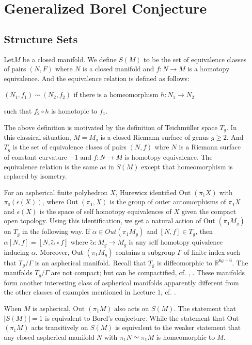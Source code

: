 \chapter{Generalized Borel Conjecture}\label{c2}

\section{Structure Sets}\label{c2:sec2.1}

Let\pageoriginale $M$ be a closed manifold. We define $S(M)$ to be the set of
equivalence classes of pairs $(N, F)$ where $N$ is a closed manifold
and $f:N \to M$ is a homotopy equivalence. And the equivalence
relation is defined as follows:
\begin{center}
  $(N_1 , f_1) \sim (N_2, f_2)$ if there is a homeomorphism $h: N_1
  \to N_2$
\end{center}
such that $f_2 \circ h$ is homotopic to $f_1$.

The above definition is motivated by the definition of Teichm\"uller
space $T_g$. In this classical situation, $M = M_g$ is a closed
Riemann surface of genus $g \geq 2$. And $T_g$ is the set of
equivalence clases of pairs $(N, f)$ whre $N$ is a Riemann surface of
constant curvature $-1$ and $f:N \to M$ is homotopy equivalence. The
equivalence relation is the same as in $S(M)$ except that
homeomorphism is replaced by isometry.

For an aspherical finite polyhedron $X$, Hurewicz identified Out
$(\pi_1 X)$ with $\pi_0 (\epsilon (X))$, where Out $(\pi_1, X)$ is the
group of outer automorphisms of $\pi_1 X$ and $\epsilon (X)$ is the
space of self homotopy equivalences of $X$ given the compact open
topology. Using this identification, we get a natural action of Out
$(\pi_1 M_g)$ on $T_g$ in the following way. If $\alpha \in Out (\pi_1
M_g)$ and $[N, f]\in T_g$, then $\alpha[N, f]= [N, \tilde{\alpha}
  \circ f]$ where $\tilde{\alpha} : M_g \to M_g$ is any self homotopy
quivalence inducing $\alpha$. Moreover, Out $(\pi_1 M_g)$ contains a
subgroup $\Gamma$ of finite index such that $T_g/\Gamma$ is an
aspherical manifold. Recall that $T_g$ is diffeomorphic to
$\mathbb{R}^{6 g-6}$. The manifolds $T_g/\Gamma$ are not compact; but
can be compactified, cf. \cite{56}, \cite{55}. These manifolds form
another interesting class of aspherical manifolds apparently different
from the other classes of examples mentioned in Lecture 1,
cf. \cite{55}.

\begin{remark*}
  When $M$ is aspherical, Out $(\pi_1 M)$ also acts on $S(M)$. The
  statement that $|S(M)|=1$ is equivalent to Borel's conjecture. While
  the statement that Out $(\pi_1 M)$ acts transitively on $S(M)$ is
  equivalent to the weaker statement that any closed aspherical
  manifold $N$ with $\pi_1 N \simeq\pi_1 M$ is homeomorphic to $M$.
\end{remark*}

